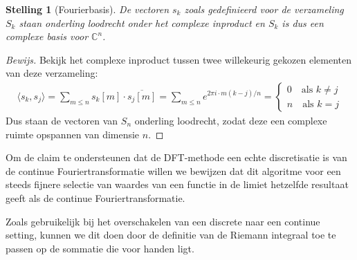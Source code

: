 \documentclass[11pt]{report}
\newcommand{\C}{\mathbb{C}}
\theoremstyle{plain}
\newtheorem*{stelling}{Stelling}
\theoremstyle{remark}
\newcommand{\eq}[1]{\begin{eqnarray*} #1 \end{eqnarray*}}
\newcommand{\inpr}[2]{\langle #1 , #2 \rangle}
\newcommand{\dpii}{{2\pi i}}
\begin{document}
\begin{stelling}[Fourierbasis]
  De vectoren $s_k$ zoals gedefinieerd voor de verzameling $S_k$ staan onderling loodrecht onder het complexe
  inproduct en $S_k$ is dus een complexe basis voor $\C^n$.
\end{stelling}
\begin{proof}[Bewijs]
  Bekijk het complexe inproduct tussen twee willekeurig gekozen elementen van deze verzameling:
  \eq{
    \inpr{s_k}{s_j} = \sum_{m\leq n} s_k[m]\cdot \overline{s_j[m]} = \sum_{m\leq n} e^{\dpii\cdot m (k-j)/n} =
    \begin{cases}
      0 \quad \text{als } k\neq j\\
      n \quad \text{als } k = j
    \end{cases}
  }
  Dus staan de vectoren van $S_n$ onderling loodrecht, zodat deze een complexe ruimte opspannen van dimensie $n$.
\end{proof}

Om de claim te ondersteunen dat de DFT-methode een echte discretisatie is van de continue Fouriertransformatie willen we bewijzen dat dit algoritme voor een steeds fijnere selectie van waardes van een functie in de limiet hetzelfde resultaat geeft als de continue Fouriertransformatie. 

Zoals gebruikelijk bij het overschakelen van een discrete naar een continue setting, kunnen we dit doen 
door de definitie van de Riemann integraal toe te passen op de sommatie die voor handen ligt.
\end{document}

